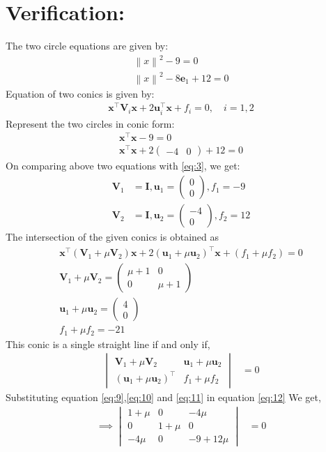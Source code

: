 \documentclass[12pt]{article}
\providecommand{\norm}[1]{\left\lVert#1\right\rVert}
\newcommand{\myvec}[1]{\ensuremath{\begin{pmatrix}#1\end{pmatrix}}}
\let\vec\mathbf
\let\vec\mathbf
\newcommand{\mydet}[1]{\ensuremath{\begin{vmatrix}#1\end{vmatrix}}}
\providecommand{\norm}[1]{\left\lVert#1\right\rVert}
\let\vec\mathbf
\begin{document}
\section*{Verification:}
 The two circle equations are given by:
\begin{align}
\label{eq:1}
	\norm{x}^2-9=0\\
	\norm{x}^2-8\vec{e}_1+12=0
\end{align}
Equation of two conics is given by:
 \begin{align}
 \vec{x}^\top\vec{V}_i\vec{x}+2\vec{u}_i^\top\vec{x}+f_i=0, \quad i=1,2
 \label{eq:3}
 \end{align}
 Represent the two circles in conic form:
 \begin{align}
	\vec{x}^\top\vec{x}-9=0\\
	\vec{x}^\top\vec{x}+2\myvec{-4&0}+12=0
\end{align}
On comparing above two equations with \eqref{eq:3}, we get:
 \begin{align}
	  \vec{V}_1&=\vec{I},\vec{u}_1=\myvec{0\\0},f_1=-9\\
	  \vec{V}_2&=\vec{I},\vec{u}_2=\myvec{-4\\0},f_2=12
\end{align}
The intersection of the given conics is obtained
as
\begin{align}
	\vec{x}^{\top}(\vec{V}_1 + \mu\vec{V}_2)\vec{x}+2 (\vec{u}_1+\mu \vec{u}_2)^{\top} \vec{x} + (f_1+\mu f_2)= 0
\\ \label{eq:9}
\vec{V}_1+\mu\vec{V}_2= \myvec{
\mu+1 & 0\\
0 & \mu+1
}
\\ \label{eq:10}
\vec{u}_1+\mu\vec{u}_2= \myvec{
4\\
0
}
\\ \label{eq:11}
f_1+\mu f_2= -21
\end{align}
This conic is a single straight line if and only if, 
\begin{align}
\mydet{\vec{V}_1 + \mu\vec{V}_2 & \vec{u}_1+\mu \vec{u}_2\\ (\vec{u}_1+\mu \vec{u}_2)^{\top} & f_1 + \mu f_2} &= 0
\label{eq:12}
\end{align}
Substituting equation \eqref{eq:9},\eqref{eq:10} and \eqref{eq:11} in equation \eqref{eq:12}
We get,
\begin{align}
\implies \mydet{1+\mu& 0 & -4\mu\\ 
0 & 1+\mu & 0 \\
-4\mu & 0 & -9+12\mu
} &= 0
\end{align}
\end{document}
